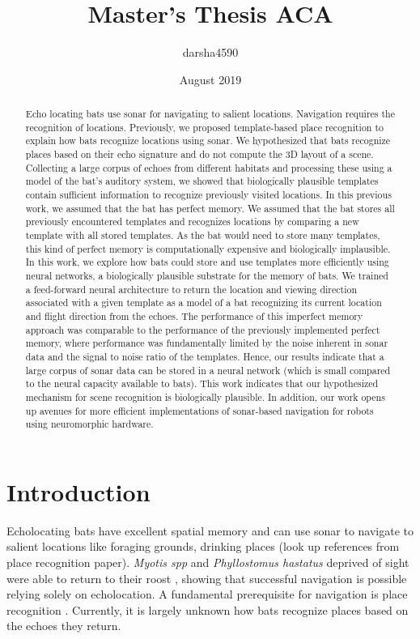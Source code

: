 \documentclass[11pt]{report}
\title{Master's Thesis ACA} %
\author{darsha4590 }
\date{August 2019}
\begin{document}
\maketitle
\tableofcontents

\begin{abstract}
    Echo locating bats use sonar for navigating to salient locations. Navigation requires the recognition of locations. Previously, we proposed template-based place recognition to explain how bats recognize locations using sonar. We hypothesized that bats recognize places based on their echo signature and do not compute the 3D layout of a scene. Collecting a large corpus of echoes from different habitats and processing these using a model of the bat's auditory system, we showed that biologically plausible templates contain sufficient information to recognize previously visited locations. In this previous work, we assumed that the bat has perfect memory. We assumed that the bat stores all previously encountered templates and recognizes locations by comparing a new template with all stored templates. As the bat would need to store many templates, this kind of perfect memory is computationally expensive and biologically implausible. In this work, we explore how bats could store and use templates more efficiently using neural networks, a biologically plausible substrate for the memory of bats. We trained a feed-forward neural architecture to return the location and viewing direction associated with a given template as a model of a bat recognizing its current location and flight direction from the echoes. The performance of this imperfect memory approach was comparable to the performance of the previously implemented perfect memory, where performance was fundamentally limited by the noise inherent in sonar data and the signal to noise ratio of the templates. Hence, our results indicate that a large corpus of sonar data can be stored in a neural network (which is small compared to the neural capacity available to bats). This work indicates that our hypothesized mechanism for scene recognition is biologically plausible. In addition, our work opens up avenues for more efficient implementations of sonar-based navigation for robots using neuromorphic hardware.
\end{abstract}


\chapter{Introduction}

Echolocating bats have excellent spatial memory \cite{barchi2013spatial} and can use sonar to navigate to salient locations like foraging grounds, drinking places (look up references from place recognition paper). \textit{Myotis spp} and \textit{Phyllostomus hastatus} deprived of sight were able to return to their roost \cite{stones1969use}, showing that successful navigation is possible relying solely on echolocation. A fundamental prerequisite for navigation is place recognition \cite{schnitzler2003spatial}. Currently, it is largely unknown how bats recognize places based on the echoes they return.
\end{document}
